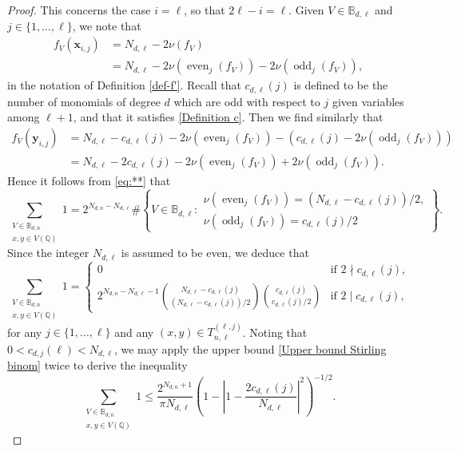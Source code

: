 \documentclass[10pt,a4paper]{amsart}
\DeclareMathOperator{\even}{even}
\DeclareMathOperator{\odd}{odd}
\newcommand{\xx}{\mathbf{x}}
\newcommand{\yy}{\mathbf{y}}
\renewcommand{\leq}{\leqslant}
\begin{document}
\begin{proof}
This concerns the case $i=\ell$, so that $2\ell-i=\ell$. 
Given $V\in 
 \mathbb{B}_{d,\ell}$ and $j\in \{1,\dots,\ell\}$, we note that
\begin{align*}
f_V(\xx_{i,j})
&=N_{d,\ell}-2\nu(f_V)\\
&=N_{d,\ell}-2\nu(\even_j(f_V))-2\nu(\odd_j(f_V)),
\end{align*}
in the notation of Definition \ref{def-f'}.
Recall that 
 $c_{d,\ell}(j)$ is defined to be the number of monomials of degree $d$ which are odd with respect to $j$ given variables among $\ell+1$, and that it satisfies  \eqref{Definition c}.
Then we find similarly that
 \begin{align*}
f_V(\yy_{i,j})
&=N_{d,\ell}-
c_{d,\ell}(j)-
2\nu(\even_j(f_V))-\left(c_{d,\ell}(j)-2\nu(\odd_j(f_V))\right)\\
&=N_{d,\ell}-
2c_{d,\ell}(j)-
2\nu(\even_j(f_V))+2\nu(\odd_j(f_V)).
\end{align*}
Hence it follows from \eqref{eq:**} that 
$$
\sum_{\substack{V \in \mathbb{B}_{d,n} \\ x, y \in V(\mathbb{Q})}} 1=
2^{N_{d,n}-N_{d,\ell}} 
\#\left\{V \in \mathbb{B}_{d,\ell} : 
\begin{array}{l}
\nu(\even_j(f_V))=(N_{d,\ell}-c_{d,\ell}(j))/2,\\
\nu(\odd_j(f_V))=c_{d,\ell}(j)/2
\end{array}\right\}.
$$
Since the integer $N_{d,\ell}$ is assumed to be even, we deduce that 
\begin{equation*}
\sum_{\substack{V \in \mathbb{B}_{d,n} \\ x, y \in V(\mathbb{Q})}} 1 =
\begin{cases}
0 & \textrm{if } 2 \nmid c_{d,\ell}(j), \\
\displaystyle{2^{N_{d,n}-N_{d,\ell}-1} \binom{N_{d,\ell}-c_{d,\ell}(j)}{(N_{d,\ell}-c_{d,\ell}(j))/2} \binom{c_{d,\ell}(j)}{c_{d,\ell}(j)/2}} & \textrm{if } 2 \mid c_{d,\ell}(j),
\end{cases}
\end{equation*}
for any  $j \in \{1, \dots, \ell\}$ and any $(x, y) \in T_{n,\ell}^{(\ell,j)}$.
Noting that $0<c_{d,j}(\ell)<N_{d,\ell}$, we may
apply the upper bound \eqref{Upper bound Stirling binom}
 twice to  derive the inequality
\begin{equation*}
\sum_{\substack{V \in \mathbb{B}_{d,n} \\ x, y \in V(\mathbb{Q})}} 1 \leq \frac{2^{N_{d,n}+1}}{\pi N_{d,\ell} } \left( 1-\left|
 1-\frac{2c_{d,\ell}(j)}{N_{d,\ell}}\right|^2\right)^{-1/2}.
\end{equation*}

\end{proof}
\end{document}

